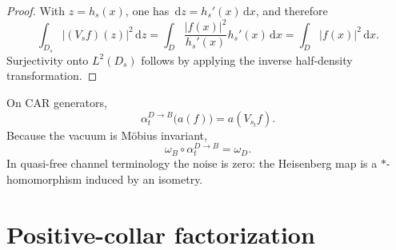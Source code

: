 \documentclass[11pt]{article}
\theoremstyle{accent}
\theoremstyle{definition}
\newcommand{\dd}{\,\mathrm{d}}
\newcommand{\abs}[1]{\left|#1\right|}
\begin{document}
\begin{proof}
With \(z=h_s(x)\), one has \(\dd z=h_s'(x)\dd x\), and therefore
\[
 \int_{D_s}\abs{(V_sf)(z)}^2\dd z
 =\int_D\frac{\abs{f(x)}^2}{h_s'(x)}h_s'(x)\dd x
 =\int_D\abs{f(x)}^2\dd x.
\]
Surjectivity onto \(L^2(D_s)\) follows by applying the inverse half-density transformation.
\end{proof}

On CAR generators,
\begin{equation}\label{eq:alpha-fields}
 \boxed{
 \alpha_t^{D\to B}\bigl(a(f)\bigr)=a(V_{s_t}f).
 }
\end{equation}
Because the vacuum is M\"obius invariant,
\begin{equation}\label{eq:reference-recovery}
 \omega_B\circ\alpha_t^{D\to B}=\omega_D.
\end{equation}
In quasi-free channel terminology the noise is zero: the Heisenberg map is a \(*\)-homomorphism induced by an isometry.

\section{Positive-collar factorization}
\end{document}
